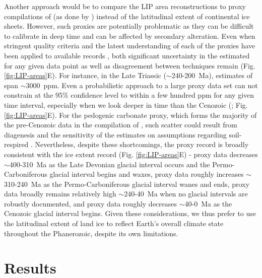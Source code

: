 Another approach would be to compare the LIP area reconstructions to proxy compilations of \pCOtwo (as done by \citealp{Johansson2018a}) instead of the latitudinal extent of continental ice sheets. However, such \pCOtwo proxies are potentially problematic as they can be difficult to calibrate in deep time and can be affected by secondary alteration. Even when stringent quality criteria and the latest understanding of each of the \pCOtwo proxies have been applied to available \pCOtwo records \citep{Foster2017a}, both significant uncertainty in the estimated \pCOtwo for any given data point as well as disagreement between techniques remain (Fig. \ref{fig:LIP-areas}E). For instance, in the Late Triassic ($\sim$240-200~Ma), estimates of \pCOtwo span $\sim$3000~ppm. Even a probabilistic approach to a large \pCOtwo proxy data set can not constrain \pCOtwo at the 95\% confidence level to within a few hundred ppm for any given time interval, especially when we look deeper in time than the Cenozoic (\citealp{Foster2017a}; Fig. \ref{fig:LIP-areas}E). For the pedogenic carbonate \dC proxy, which forms the majority of the pre-Cenozoic data in the compilation of \citet{Foster2017a}, such scatter could result from diagenesis \citep{Michel2016a} and the sensitivity of the \pCOtwo estimates on assumptions regarding soil-respired \COtwo \citep{Montanez2013a}. Nevertheless, despite these shortcomings, the \pCOtwo proxy record is broadly consistent with the ice extent record (Fig. \ref{fig:LIP-areas}E) - \pCOtwo proxy data decreases $\sim$400-310~Ma as the Late Devonian glacial interval occurs and the Permo-Carboniferous glacial interval begins and waxes, \pCOtwo proxy data roughly increases $\sim$310-240~Ma as the Permo-Carboniferous glacial interval wanes and ends, \pCOtwo proxy data broadly remains relatively high $\sim$240-40~Ma when no glacial intervals are robustly documented, and \pCOtwo proxy data roughly decreases $\sim$40-0~Ma as the Cenozoic glacial interval begins. Given these considerations, we thus prefer to use the latitudinal extent of land ice to reflect Earth's overall climate state throughout the Phanerozoic, despite its own limitations.

\section{Results}

